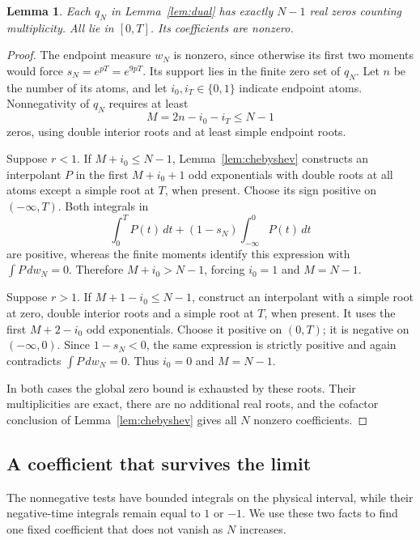 \documentclass[11pt]{article}
\newtheorem{lemma}[theorem]{Lemma}
\theoremstyle{remark}
\begin{document}
\begin{lemma}\label{lem:roots}
Each $q_N$ in Lemma~\ref{lem:dual} has exactly $N-1$ real zeros counting
multiplicity. All lie in $[0,T]$. Its coefficients are nonzero.
\end{lemma}
\begin{proof}
The endpoint measure $w_N$ is nonzero, since otherwise its first two moments
would force $s_N=e^{pT}=e^{9pT}$. Its support lies in the finite zero set of
$q_N$. Let $n$ be the number of its atoms, and let $i_0,i_T\in\{0,1\}$
indicate endpoint atoms. Nonnegativity of $q_N$ requires at least
\[
 M=2n-i_0-i_T\le N-1
\]
zeros, using double interior roots and at least simple endpoint roots.

Suppose $r<1$. If $M+i_0\le N-1$, Lemma~\ref{lem:chebyshev} constructs
an interpolant $P$ in the first $M+i_0+1$ odd exponentials with double roots
at all atoms except a simple root at $T$, when present. Choose its sign
positive on $(-\infty,T)$. Both integrals in
\[
 \int_0^TP(t)\,dt+(1-s_N)\int_{-\infty}^0P(t)\,dt
\]
are positive, whereas the finite moments identify this expression with
$\int P\,dw_N=0$. Therefore $M+i_0>N-1$, forcing $i_0=1$ and $M=N-1$.

Suppose $r>1$. If $M+1-i_0\le N-1$, construct an interpolant with a simple
root at zero, double interior roots and a simple root at $T$, when present.
It uses the first $M+2-i_0$ odd exponentials. Choose it positive on $(0,T)$;
it is negative on $(-\infty,0)$. Since $1-s_N<0$, the same expression is
strictly positive and again contradicts $\int P\,dw_N=0$. Thus $i_0=0$
and $M=N-1$.

In both cases the global zero bound is exhausted by these roots. Their
multiplicities are exact, there are no additional real roots, and the
cofactor conclusion of Lemma~\ref{lem:chebyshev} gives all $N$ nonzero
coefficients.
\end{proof}

\subsection{A coefficient that survives the limit}

The nonnegative tests have bounded integrals on the physical interval, while
their negative-time integrals remain equal to $1$ or $-1$. We use these two
facts to find one fixed coefficient that does not vanish as $N$ increases.
\end{document}
